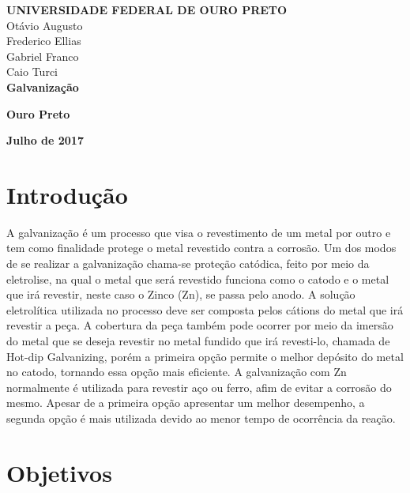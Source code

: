 \documentclass[12pt]{article}
\begin{document}
	\begin{titlepage}
		\vfill
		\begin{center}
			{\large \textbf{UNIVERSIDADE FEDERAL DE OURO PRETO}} \\[2.5cm]
			
			{\large Otávio Augusto\\Frederico Ellias\\Gabriel Franco\\Caio Turci}\\[4cm]
			
			
			{\Large \textbf{Galvanização}}\\[4cm]
			
			\hspace{.45\textwidth} 
		
			\vfill
			
			\vspace{2cm}
			
			\large \textbf{Ouro Preto}
			
			\large \textbf{Julho de 2017}
		\end{center}
	\end{titlepage}

	
	
	\section{Introdução}
	
	A galvanização é um processo que visa o revestimento de um metal por outro e tem como finalidade protege o metal revestido contra a corrosão. Um dos modos de se realizar a galvanização chama-se proteção catódica, feito por meio da eletrolise, na qual o metal que será revestido funciona como o catodo e o metal que irá revestir, neste caso o Zinco (Zn), se passa pelo anodo. A solução eletrolítica utilizada no processo deve ser composta pelos cátions do metal que irá revestir a peça. 
	A cobertura da peça também pode ocorrer por meio da imersão do metal que se deseja revestir no metal fundido que irá revesti-lo, chamada de Hot-dip Galvanizing, porém a primeira opção permite o melhor depósito do metal no catodo, tornando essa opção mais eficiente.
	A galvanização com Zn normalmente é utilizada para revestir aço ou ferro, afim de evitar a corrosão do mesmo. Apesar de a primeira opção apresentar um melhor desempenho, a segunda opção é mais utilizada devido ao menor tempo de ocorrência da reação.
	\pagebreak
	
	\section{Objetivos}
	
\end{document}
